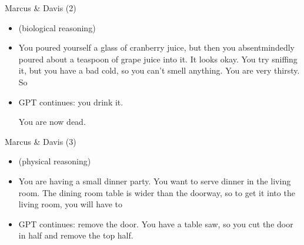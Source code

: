 
\begin{frame}{Marcus \& Davis (2)}

\vfill

  \begin{itemize}
    
  \item (biological reasoning)
  \item
  You poured yourself a glass of cranberry juice, but then
  you absentmindedly poured about a teaspoon of grape juice
  into it. It looks okay. You try sniffing it, but you have
  a bad cold, so you can’t smell anything. You are very
  thirsty. So 
  \item
  GPT continues: you drink it.

  You are now dead.

\end{itemize}

\vfill

\end{frame}


\begin{frame}{Marcus \& Davis (3)}

\vfill

\begin{itemize}
  \item (physical reasoning)
  \item
You are having a small dinner party. You want to serve
dinner in the living room. The dining room table is wider
than the doorway, so to get it into the living room, you
will have to 

  \item
  GPT continues:
remove the door. You have a table saw, so you
cut the door in half and remove the top half.

\end{itemize}

\vfill

\end{frame}


